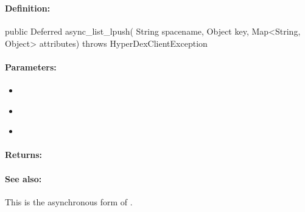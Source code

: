 \pagebreak
\subsubsection{}
\label{api:java:async_list_lpush}


\paragraph{Definition:}
\begin{javacode}
public Deferred async_list_lpush(
        String spacename,
        Object key,
        Map<String, Object> attributes) throws HyperDexClientException
\end{javacode}

\paragraph{Parameters:}
\begin{itemize}[noitemsep]
\item {}\\

\item {}\\

\item {}\\

\end{itemize}

\paragraph{Returns:}


\paragraph{See also:}  This is the asynchronous form of .

\pagebreak
\subsubsection{}
\label{api:java:cond_list_lpush}


